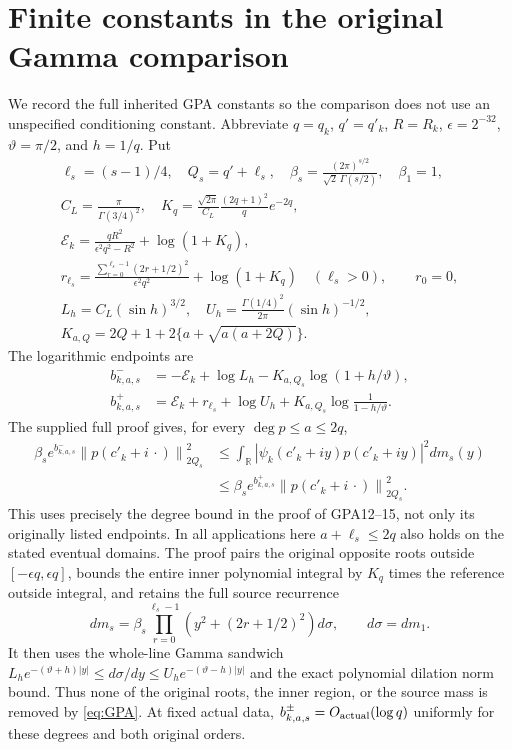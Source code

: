 \documentclass[11pt,a4paper]{article}
\newcommand{\R}{\mathbb R}
\newcommand{\norm}[1]{\left\lVert#1\right\rVert}
\begin{document}
\section{Finite constants in the original Gamma comparison}
We record the full inherited GPA constants so the comparison does not use an unspecified conditioning constant. Abbreviate $q=q_k$, $q'=q'_k$, $R=R_k$, $\epsilon=2^{-32}$, $\vartheta=\pi/2$, and $h=1/q$. Put
\begin{equation}
\begin{gathered}
 \ell_s=(s-1)/4,\quad Q_s=q'+\ell_s,\quad
 \beta_s=\frac{(2\pi)^{s/2}}{\sqrt2\,\Gamma(s/2)},\quad \beta_1=1,\\
 C_L=\frac\pi{\Gamma(3/4)^2},\quad
 K_q=\frac{\sqrt{2\pi}}{C_L}\frac{(2q+1)^2}{q}e^{-2q},\\
 \mathcal E_k=\frac{qR^2}{\epsilon^2q^2-R^2}+\log(1+K_q),\\
 r_{\ell_s}=\frac{\sum_{r=0}^{\ell_s-1}(2r+1/2)^2}{\epsilon^2q^2}
                 +\log(1+K_q)\quad(\ell_s>0),\qquad r_0=0,\\
 L_h=C_L(\sin h)^{3/2},\quad
 U_h=\frac{\Gamma(1/4)^2}{2\pi}(\sin h)^{-1/2},\\
 K_{a,Q}=2Q+1+2\{a+\sqrt{a(a+2Q)}\}.
\end{gathered}\label{eq:GPconst}
\end{equation}
The logarithmic endpoints are
\begin{equation}
\begin{split}
 b^-_{k,a,s}&=-\mathcal E_k+\log L_h-K_{a,Q_s}\log(1+h/\vartheta),\\
 b^+_{k,a,s}&=\mathcal E_k+r_{\ell_s}+\log U_h
                    +K_{a,Q_s}\log\frac1{1-h/\vartheta}.
\end{split}\label{eq:bconst}
\end{equation}
The supplied full proof gives, for every $\deg p\le a\le2q$,
\begin{equation}
\begin{split}
 \beta_s e^{b^-_{k,a,s}}
\norm{p(c'_k+i\,\cdot)}_{2Q_s}^2
 &\le \int_{\R}|\psi_k(c'_k+iy)p(c'_k+iy)|^2dm_s(y)\\
 &\le\beta_s e^{b^+_{k,a,s}}
\norm{p(c'_k+i\,\cdot)}_{2Q_s}^2.
\end{split}\label{eq:GPA}
\end{equation}
This uses precisely the degree bound in the proof of GPA12--15, not only its originally listed endpoints. In all applications here $a+\ell_s\le2q$ also holds on the stated eventual domains. The proof pairs the original opposite roots outside $[-\epsilon q,\epsilon q]$, bounds the entire inner polynomial integral by $K_q$ times the reference outside integral, and retains the full source recurrence
\[
 dm_s=\beta_s\prod_{r=0}^{\ell_s-1}(y^2+(2r+1/2)^2)d\sigma,
 \qquad d\sigma=dm_1.
\]
It then uses the whole-line Gamma sandwich $L_he^{-(\vartheta+h)|y|}\le d\sigma/dy\le U_he^{-(\vartheta-h)|y|}$ and the exact polynomial dilation norm bound. Thus none of the original roots, the inner region, or the source mass is removed by \eqref{eq:GPA}. At fixed actual data, $b^\pm_{k,a,s}=O_{\rm actual}(\log q)$ uniformly for these degrees and both original orders.
\end{document}
